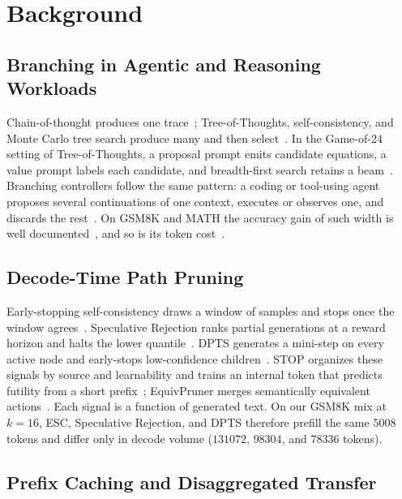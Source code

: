 \section{Background}
\label{sec:bg-full}

\subsection{Branching in Agentic and Reasoning Workloads}
\label{sec:bg-search}

Chain-of-thought produces one trace~\cite{cot}; Tree-of-Thoughts, self-consistency, and Monte Carlo tree search produce many and then select~\cite{tot,selfconsistency,mctsllm}.
In the Game-of-24 setting of Tree-of-Thoughts, a proposal prompt emits candidate equations, a value prompt labels each candidate, and breadth-first search retains a beam~\cite{tot}.
Branching controllers follow the same pattern: a coding or tool-using agent proposes several continuations of one context, executes or observes one, and discards the rest~\cite{react,sweagent,openhands}.
On GSM8K and MATH the accuracy gain of such width is well documented~\cite{gsm8k,math,math500}, and so is its token cost~\cite{equivpruner,stoploss}.

\subsection{Decode-Time Path Pruning}
\label{sec:bg-prune}

Early-stopping self-consistency draws a window of samples and stops once the window agrees~\cite{esc,selfconsistency}.
Speculative Rejection ranks partial generations at a reward horizon and halts the lower quantile~\cite{specrej}.
DPTS generates a mini-step on every active node and early-stops low-confidence children~\cite{dpts}.
STOP organizes these signals by source and learnability and trains an internal token that predicts futility from a short prefix~\cite{stoploss}; EquivPruner merges semantically equivalent actions~\cite{equivpruner}.
Each signal is a function of generated text.
On our GSM8K mix at $k{=}16$, ESC, Speculative Rejection, and DPTS therefore prefill the same $5008$ tokens and differ only in decode volume ($131072$, $98304$, and $78336$ tokens).

\subsection{Prefix Caching and Disaggregated Transfer}
\label{sec:bg-pd}


